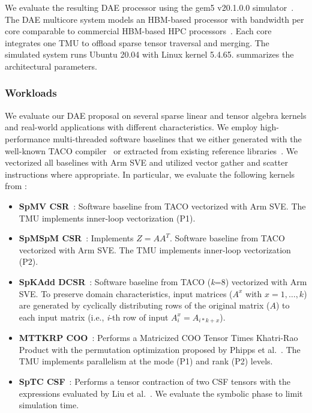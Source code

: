 

We evaluate the resulting DAE processor using the gem5 v20.1.0.0 simulator~\cite{lowepower2020gem5}. The DAE multicore system models an HBM-based processor with bandwidth per core comparable to commercial HBM-based HPC processors~\cite{sato2020design}. Each core integrates one TMU to offload sparse tensor traversal and merging. The simulated system runs Ubuntu 20.04 with Linux kernel 5.4.65.  summarizes the architectural parameters.

\subsubsection{Workloads} \label{sec:tmu-scientific-workloads} %

We evaluate our DAE proposal on several sparse linear and tensor algebra kernels and real-world applications with different characteristics. We employ high-performance multi-threaded software baselines that we either generated with the well-known TACO compiler~\cite{kjolstad2017oopsla} or extracted from existing reference libraries~\cite{phipps2019software,liu2021sparta}.
We vectorized all baselines with Arm SVE and utilized vector gather and scatter instructions where appropriate.
In particular, we evaluate the following kernels from :
\begin{itemize}
    \item \textbf{SpMV CSR}~\cite{williams2007sc}: Software baseline from TACO vectorized with Arm SVE. The TMU implements inner-loop vectorization (P1).
    \item \textbf{SpMSpM CSR}~\cite{gao2023systematic}: Implements $Z=AA^T$. Software baseline from TACO vectorized with Arm SVE. The TMU implements inner-loop vectorization (P2).
    \item \textbf{SpKAdd DCSR}~\cite{hussain2022ipdps}: Software baseline from TACO (\textit{k}=8) vectorized with Arm SVE. To preserve domain characteristics, input matrices ($A^x$ with $x=1,\ldots,k$) are generated by cyclically distributing rows of the original matrix ($A$) to each input matrix (i.e., \textit{i}-th row of input $A^x_i=A_{i*k+x}$).
    \item \textbf{MTTKRP COO}~\cite{phipps2019software}: Performs a Matricized COO Tensor Times Khatri-Rao Product with the permutation optimization proposed by Phipps et al.~\cite{phipps2019software}. The TMU implements parallelism at the mode (P1) and rank (P2) levels.
    \item \textbf{SpTC CSF}~\cite{liu2021sparta}: Performs a tensor contraction of two CSF tensors with the expressions evaluated by Liu et al.~\cite{liu2021sparta}. We evaluate the symbolic phase to limit simulation time.
\end{itemize}
